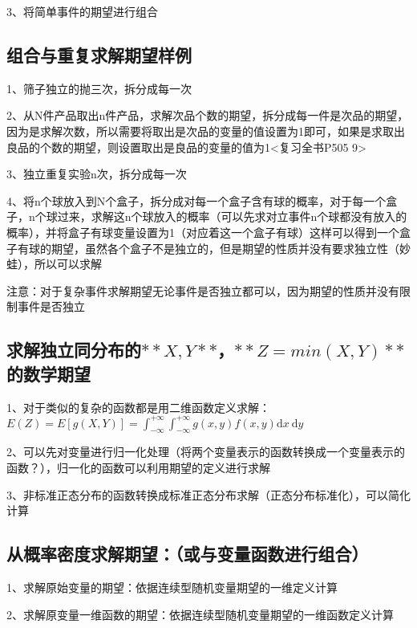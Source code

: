 3、将简单事件的期望进行组合



\subsection{组合与重复求解期望样例}

1、筛子独立的抛三次，拆分成每一次

2、从N件产品取出n件产品，求解次品个数的期望，拆分成每一件是次品的期望，因为是求解次数，所以需要将取出是次品的变量的值设置为1即可，如果是求取出良品的个数的期望，则设置取出是良品的变量的值为1<复习全书P505 9>

3、独立重复实验n次，拆分成每一次

4、将n个球放入到N个盒子，拆分成对每一个盒子含有球的概率，对于每一个盒子，n个球过来，求解这n个球放入的概率（可以先求对立事件n个球都没有放入的概率），并将盒子有球变量设置为1（对应着这一个盒子有球）这样可以得到一个盒子有球的期望，虽然各个盒子不是独立的，但是期望的性质并没有要求独立性（妙蛙），所以可以求解

注意：对于复杂事件求解期望无论事件是否独立都可以，因为期望的性质并没有限制事件是否独立



\subsection{求解独立同分布的$ **X,Y** $，$ **Z=min(X,Y)** $的数学期望}

1、对于类似的复杂的函数都是用二维函数定义求解：$ E(Z)=E[g(X, Y)]=\int_{-\infty}^{+\infty} \int_{-\infty}^{+\infty} g(x, y) f(x, y) \mathrm{d} x \mathrm{~d} y $

2、可以先对变量进行归一化处理（将两个变量表示的函数转换成一个变量表示的函数？），归一化的函数可以利用期望的定义进行求解

3、非标准正态分布的函数转换成标准正态分布求解（正态分布标准化），可以简化计算



\subsection{从概率密度求解期望：（或与变量函数进行组合）}

1、求解原始变量的期望：依据连续型随机变量期望的一维定义计算

2、求解原变量一维函数的期望：依据连续型随机变量期望的一维函数定义计算

